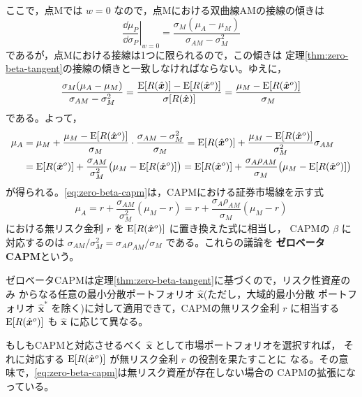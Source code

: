 ここで，点Mでは $w=0$ なので，点Mにおける双曲線AMの接線の傾きは
\begin{equation}
\left.\frac{\dd\mu_P}{\dd\sigma_P}\right|_{w=0}
= \frac{\sigma_M(\mu_A - \mu_M)}{\sigma_{AM} - \sigma_M^2}
\end{equation}
であるが，点Mにおける接線は1つに限られるので，この傾きは
定理\ref{thm:zero-beta-tangent}の接線の傾きと一致しなければならない。ゆえに，
\begin{equation}
\frac{\sigma_M(\mu_A-\mu_M)}{\sigma_{AM}-\sigma_M^2}
= \frac{\mathrm{E}[R(\hat{\bm{x}})] - \mathrm{E}[R(\hat{\bm{x}}^o)]}{\sigma[R(\hat{\bm{x}})]}
= \frac{\mu_M - \mathrm{E}[R(\hat{\bm{x}}^o)]}{\sigma_M}
\end{equation}
である。よって，
\begin{align}
\mu_A &= \mu_M + \frac{\mu_M - \mathrm{E}[R(\hat{\bm{x}}^o)]}{\sigma_M}
\cdot\frac{\sigma_{AM}-\sigma_M^2}{\sigma_M}
= \mathrm{E}[R(\hat{\bm{x}}^o)]
+ \frac{\mu_M - \mathrm{E}[R(\hat{\bm{x}}^o)]}{\sigma_M^2}\sigma_{AM}\notag\\
&= \mathrm{E}[R(\hat{\bm{x}}^o)] + \frac{\sigma_{AM}}{\sigma_M^2}
\bigl(\mu_M - \mathrm{E}[R(\hat{\bm{x}}^o)]\bigr)
= \mathrm{E}[R(\hat{\bm{x}}^o)] + \frac{\sigma_A\rho_{AM}}{\sigma_M}
\bigl(\mu_M - \mathrm{E}[R(\hat{\bm{x}}^o)]\bigr)
\label{eq:zero-beta-capm}
\end{align}
が得られる。\eqref{eq:zero-beta-capm}は，CAPMにおける証券市場線を示す式
\begin{equation}
\mu_A = r + \frac{\sigma_{AM}}{\sigma_M^2}(\mu_M - r)
= r + \frac{\sigma_A\rho_{AM}}{\sigma_M}(\mu_M - r)
\end{equation}
における無リスク金利 $r$ を $\mathrm{E}[R(\hat{\bm{x}}^o)]$ に置き換えた式に相当し，
CAPMの $\beta$ に対応するのは
$\sigma_{AM}/\sigma_M^2 = \sigma_A\rho_{AM}/\sigma_M$ である。これらの議論を
\textbf{ゼロベータCAPM}という。

\begin{remark}
ゼロベータCAPMは定理\ref{thm:zero-beta-tangent}に基づくので，リスク性資産のみ
からなる任意の最小分散ポートフォリオ $\hat{\bm{x}}$(ただし，大域的最小分散
ポートフォリオ $\hat{\bm{x}}^*$ を除く)に対して適用できて，CAPMの無リスク金利
$r$ に相当する $\mathrm{E}[R(\hat{\bm{x}}^o)]$ も $\hat{\bm{x}}$ に応じて異なる。
\end{remark}

\begin{remark}
もしもCAPMと対応させるべく $\hat{\bm{x}}$ として市場ポートフォリオを選択すれば，
それに対応する $\mathrm{E}[R(\hat{\bm{x}}^o)]$ が無リスク金利 $r$ の役割を果たすことに
なる。その意味で，\eqref{eq:zero-beta-capm}は無リスク資産が存在しない場合の
CAPMの拡張になっている。
\end{remark}

